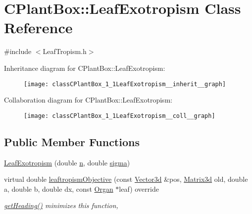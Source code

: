 \hypertarget{classCPlantBox_1_1LeafExotropism}{}\section{C\+Plant\+Box\+:\+:Leaf\+Exotropism Class Reference}
\label{classCPlantBox_1_1LeafExotropism}


{\ttfamily \#include $<$Leaf\+Tropism.\+h$>$}



Inheritance diagram for C\+Plant\+Box\+:\+:Leaf\+Exotropism\+:\nopagebreak
\begin{figure}[H]
\begin{center}
\leavevmode
\texttt{[image: classCPlantBox\_1\_1LeafExotropism\_\_inherit\_\_graph]}
\end{center}
\end{figure}


Collaboration diagram for C\+Plant\+Box\+:\+:Leaf\+Exotropism\+:\nopagebreak
\begin{figure}[H]
\begin{center}
\leavevmode
\texttt{[image: classCPlantBox\_1\_1LeafExotropism\_\_coll\_\_graph]}
\end{center}
\end{figure}
\subsection*{Public Member Functions}
\begin{DoxyCompactItemize}
\item 
\hyperlink{classCPlantBox_1_1LeafExotropism_ad5e3bd8a6dcd60d33d31ed7df89a0078}{Leaf\+Exotropism} (double \hyperlink{classCPlantBox_1_1LeafTropismFunction_a21d8d756f8b9f6015b546def33b01c89}{n}, double \hyperlink{classCPlantBox_1_1LeafTropismFunction_a82a3dc11056a65501bc4535749c304b6}{sigma})
\item 
virtual double \hyperlink{classCPlantBox_1_1LeafExotropism_a0b3820189c2cef88d32a0d8130c15246}{leaftropism\+Objective} (const \hyperlink{classCPlantBox_1_1Vector3d}{Vector3d} \&pos, \hyperlink{classCPlantBox_1_1Matrix3d}{Matrix3d} old, double a, double b, double dx, const \hyperlink{classCPlantBox_1_1Organ}{Organ} $\ast$leaf) override
\begin{DoxyCompactList}\small\item\em \hyperlink{classCPlantBox_1_1LeafTropismFunction_a1440868221a834474e34e3a503a74572}{get\+Heading()} minimizes this function, \end{DoxyCompactList}\end{DoxyCompactItemize}
